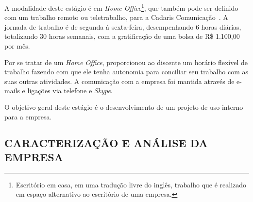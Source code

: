 \documentclass[
  12pt,				%
  openany,
  oneside,
  a4paper,			%
  english,			%
  brazil
]{article}
\numberwithin{figure}{section}
\numberwithin{table}{section}
\begin{document}
A modalidade deste estágio é em \textit{Home Office}\footnote{Escritório em casa, em uma tradução livre do inglês, trabalho que é realizado em espaço alternativo ao escritório de uma empresa.}, que também pode ser definido com um trabalho remoto ou teletrabalho, para a Cadaris Comunicação~\cite{cadaris}. A jornada de trabalho é de segunda à sexta-feira, desempenhando 6 horas diárias, totalizando 30 horas semanais, com a gratificação de uma bolsa de R\$ 1.100,00 por mês.

Por se tratar de um \textit{Home Office}, proporcionou ao discente um horário flexível de trabalho fazendo com que ele tenha autonomia para conciliar seu trabalho com as suas outras atividades. A comunicação com a empresa foi mantida através de e-mails e ligações via telefone e \textit{Skype}.

O objetivo geral deste estágio é o desenvolvimento de um projeto de uso interno para a empresa.




\subsection{CARACTERIZAÇÃO E ANÁLISE DA EMPRESA}


\end{document}
